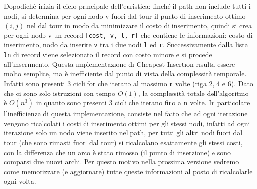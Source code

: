 \documentclass[a4paper,12pt]{report}
\begin{document}
Dopodiché inizia il ciclo principale dell'euristica: finché il path non include tutti i nodi, si determina per ogni nodo v fuori dal tour il punto di inserimento ottimo $(i, j)$ nel dal tour in modo da minimizzare il costo di inserimento, quindi si crea per ogni nodo v un record \lstinline![cost, v, l, r]! che contiene le informazioni: costo di inserimento, nodo da inserire \lstinline!v! tra i due nodi \lstinline!l! ed \lstinline!r!. Successivamente dalla lista \lstinline!ln! di record viene selezionato il record con costo minore e si procede all'inserimento. \newline
Questa implementazione di Cheapest Insertion risulta essere molto semplice, ma è inefficiente dal punto di vista della complessità temporale. Infatti sono presenti 3 cicli for che iterano al massimo n volte (riga 2, 4 e 6). Dato che ci sono solo istruzioni con tempo $O(1)$, la complessità totale dell'algoritmo è $O(n^3)$ in quanto sono presenti 3 cicli che iterano fino a n volte. \newline
In particolare l'inefficienza di questa implementazione, consiste nel fatto che ad ogni iterazione vengono ricalcolati i costi di inserimento ottimi per gli stessi nodi, infatti ad ogni iterazione solo un nodo viene inserito nel path, per tutti gli altri nodi fuori dal tour (che sono rimasti fuori dal tour) si ricalcolano esattamente gli stessi costi, con la differenza che un arco è stato rimosso (il punto di inserzione) e sono comparsi due nuovi archi. Per questo motivo nella prossima versione vedremo come memorizzare (e aggiornare) tutte queste informazioni al posto di ricalcolarle ogni volta.
\end{document}
